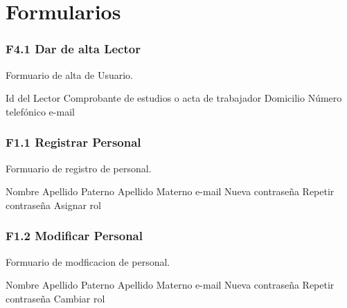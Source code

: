 \chapter{Formularios}
\label{appendix:Formularios}

\subsection{F4.1 Dar de alta Lector }
  Formuario de alta de Usuario.\\

	\begin{UClist}
      \UCli Id del Lector
      \UCli Comprobante de estudios o acta de trabajador
      \UCli Domicilio
      \UCli Número telefónico
      \UCli e-mail
    \end{UClist}

\subsection{F1.1 Registrar Personal }
  Formuario de registro de personal.\\

  \begin{UClist}
      \UCli Nombre
      \UCli Apellido Paterno
      \UCli Apellido Materno
      \UCli e-mail
      \UCli Nueva contraseña
      \UCli Repetir contraseña
      \UCli Asignar rol 
    \end{UClist}

\subsection{F1.2 Modificar Personal }
  Formuario de modficacion de personal.\\

  \begin{UClist}
      \UCli Nombre
      \UCli Apellido Paterno
      \UCli Apellido Materno
      \UCli e-mail
      \UCli Nueva contraseña
      \UCli Repetir contraseña
      \UCli Cambiar rol 
    \end{UClist}






